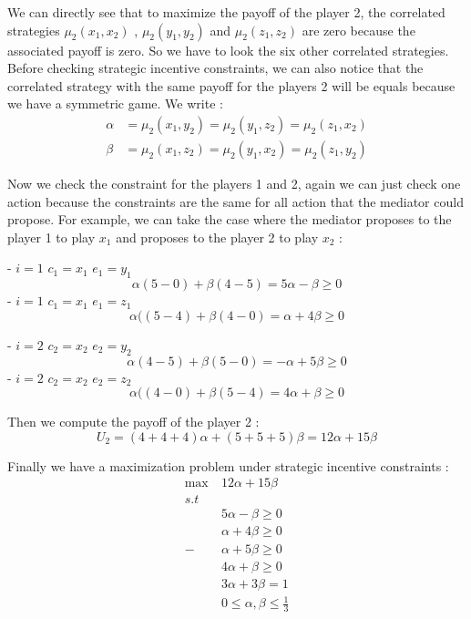We can directly see that to maximize the payoff of the player 2, the correlated strategies $\mu_2(x_1,x_2)$ , $\mu_2(y_1,y_2)$ and $\mu_2(z_1,z_2)$ are zero because the associated payoff is zero. So we have to look the six other correlated strategies. Before checking strategic incentive constraints, we can also notice that the correlated strategy with the same payoff for the players 2 will be equals because we have a symmetric game. We write :
\begin{align*}
    \alpha &= \mu_2(x_1,y_2) = \mu_2(y_1,z_2) = \mu_2(z_1,x_2) \\
    \beta &= \mu_2(x_1,z_2) = \mu_2(y_1,x_2) = \mu_2(z_1,y_2)
\end{align*}

Now we check the constraint for the players 1 and 2, again we can just check one action because the constraints are the same for all action that the mediator could propose. For example, we can take the case where the mediator proposes to the player 1 to play $x_1$ and proposes to the player 2 to play $x_2$ :

- $i=1$ $c_1=x_1$  $e_1=y_1$
\begin{equation*}
    \alpha(5-0) + \beta(4-5) = 5\alpha - \beta \ge 0
\end{equation*}
- $i=1$ $c_1=x_1$  $e_1=z_1$
\begin{equation*}
    \alpha((5-4) + \beta(4-0) = \alpha + 4\beta \ge 0
\end{equation*}

- $i=2$ $c_2=x_2$  $e_2=y_2$
\begin{equation*}
    \alpha(4-5) + \beta(5-0) = - \alpha + 5\beta \ge 0
\end{equation*}
- $i=2$ $c_2=x_2$  $e_2=z_2$
\begin{equation*}
    \alpha((4-0) + \beta(5-4) = 4\alpha + \beta \ge 0
\end{equation*}

Then we compute the payoff of the player 2 :
\begin{equation*}
    U_2 = (4+4+4)\alpha + (5+5+5)\beta = 12\alpha + 15\beta
\end{equation*}

Finally we have a maximization problem under strategic incentive constraints :
\begin{align*}
    \max \ & 12\alpha + 15\beta \\
      s.t& \\     
      & 5\alpha - \beta \ge 0 \\
      & \alpha + 4\beta \ge 0 \\
      -& \alpha + 5\beta \ge 0 \\
      & 4\alpha + \beta \ge 0 \\
      & 3\alpha + 3\beta = 1 \\
      & 0 \le \alpha,\beta \le \frac{1}{3}
\end{align*}

